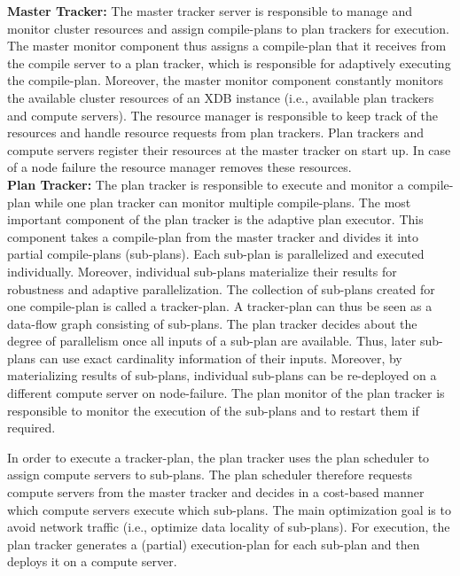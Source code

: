 \documentclass{sig-alternate}
\begin{document}
{\bf Master Tracker:} The master tracker server is responsible to manage and monitor cluster resources and assign compile-plans to plan trackers for execution. The master monitor component thus assigns a compile-plan that it receives from the compile server to a plan tracker, which is responsible for adaptively executing the compile-plan. Moreover, the master monitor component constantly monitors the available cluster resources of an XDB instance (i.e., available plan trackers and compute servers). The resource manager is responsible to keep track of the resources and handle resource requests from plan trackers. Plan trackers and compute servers register their resources at the master tracker on start up. In case of a node failure the resource manager removes these resources. \\

{\bf Plan Tracker:} The plan tracker is responsible to execute and monitor a compile-plan while one plan tracker can monitor multiple compile-plans. The most important component of the plan tracker is the adaptive plan executor. This component takes a compile-plan from the master tracker and divides it into partial compile-plans (sub-plans). Each sub-plan is parallelized and executed individually. Moreover, individual sub-plans materialize their results for robustness and adaptive parallelization.  The collection of sub-plans created for one compile-plan is called a tracker-plan. A tracker-plan can thus be seen as a data-flow graph consisting of sub-plans. The plan tracker decides about the degree of parallelism once all inputs of a sub-plan are available. Thus, later sub-plans can use  exact cardinality information of their inputs. Moreover, by materializing results of sub-plans, individual sub-plans can be re-deployed on a different compute server on node-failure. The plan monitor of the plan tracker is responsible to monitor the execution of the sub-plans and to restart them if required. 

In order to execute a tracker-plan, the plan tracker uses the plan scheduler to assign compute servers to sub-plans. The plan scheduler therefore requests compute servers from the master tracker and decides in a cost-based manner which compute servers execute which sub-plans. The main optimization goal is to avoid network traffic (i.e., optimize data locality of sub-plans). For execution, the plan tracker generates a (partial) execution-plan for each sub-plan and then deploys it on a compute server. \\
\end{document}
